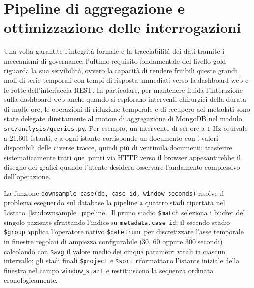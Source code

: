 \section{Pipeline di aggregazione e ottimizzazione delle interrogazioni}
Una volta garantite l'integrit\`a formale e la tracciabilit\`a dei dati tramite i meccanismi di governance, l'ultimo requisito fondamentale del livello gold riguarda la sua servibilit\`a, ovvero la capacit\`a di rendere fruibili queste grandi moli di serie temporali con tempi di risposta immediati verso la dashboard web e le rotte dell'interfaccia REST. In particolare, per mantenere fluida l'interazione sulla dashboard web anche quando si esplorano interventi chirurgici della durata di molte ore, le operazioni di riduzione temporale e di recupero dei metadati sono state delegate direttamente al motore di aggregazione di MongoDB nel modulo \texttt{src/analysis/queries.py}. Per esempio, un intervento di sei ore a $1\text{ Hz}$ equivale a 21.600 istanti, e a ogni istante corrisponde un documento con i valori disponibili delle diverse tracce, quindi pi\`u di ventimila documenti: trasferire sistematicamente tutti quei punti via HTTP verso il browser appesantirebbe il disegno dei grafici quando l'utente desidera osservare l'andamento complessivo dell'operazione.

La funzione \texttt{downsample\_case(db, case\_id, window\_seconds)} risolve il problema eseguendo sul database la pipeline a quattro stadi riportata nel Listato~\ref{lst:downsample_pipeline}. Il primo stadio \texttt{\$match} seleziona i bucket del singolo paziente sfruttando l'indice su \texttt{metadata.case\_id}; il secondo stadio \texttt{\$group} applica l'operatore nativo \texttt{\$dateTrunc} per discretizzare l'asse temporale in finestre regolari di ampiezza configurabile ($30$, $60$ oppure $300$ secondi) calcolando con \texttt{\$avg} il valore medio dei cinque parametri vitali in ciascun intervallo; gli stadi finali \texttt{\$project} e \texttt{\$sort} riformattano l'istante iniziale della finestra nel campo \texttt{window\_start} e restituiscono la sequenza ordinata cronologicamente.

